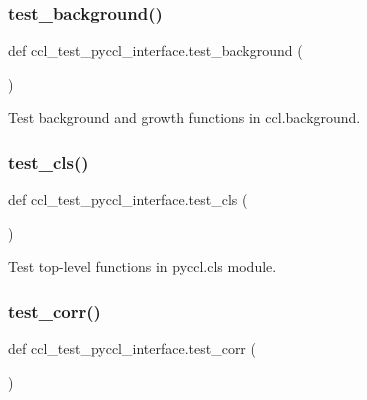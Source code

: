 \subsubsection{\texorpdfstring{test\+\_\+background()}{test\_background()}}
{\footnotesize\ttfamily def ccl\+\_\+test\+\_\+pyccl\+\_\+interface.\+test\+\_\+background (\begin{DoxyParamCaption}{ }\end{DoxyParamCaption})}

\begin{DoxyVerb}Test background and growth functions in ccl.background.
\end{DoxyVerb}
 \mbox{\label{namespaceccl__test__pyccl__interface_af43480922699de3f04ac202305e22666}} 
\subsubsection{\texorpdfstring{test\+\_\+cls()}{test\_cls()}}
{\footnotesize\ttfamily def ccl\+\_\+test\+\_\+pyccl\+\_\+interface.\+test\+\_\+cls (\begin{DoxyParamCaption}{ }\end{DoxyParamCaption})}

\begin{DoxyVerb}Test top-level functions in pyccl.cls module.
\end{DoxyVerb}
 \mbox{\label{namespaceccl__test__pyccl__interface_ac7244d534c03943f2b622f66d8b5e431}} 
\subsubsection{\texorpdfstring{test\+\_\+corr()}{test\_corr()}}
{\footnotesize\ttfamily def ccl\+\_\+test\+\_\+pyccl\+\_\+interface.\+test\+\_\+corr (\begin{DoxyParamCaption}{ }\end{DoxyParamCaption})}

